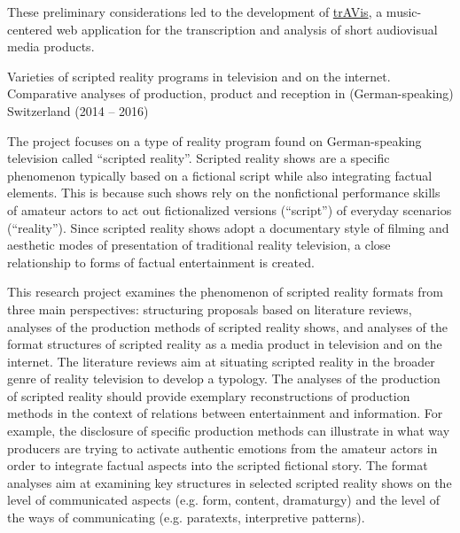 \documentclass[9pt]{article}
\begin{document}
\noindent These preliminary considerations led to the development of \href{http://populaerkultur.unibas.ch/home/av-analyse/travis-en/}{trAVis}, a music-centered web application for the transcription and analysis of short audiovisual media products.

\medskip
{}



\bigskip
{}
\newline\noindent\textsf{\large Varieties of scripted reality programs in television and on the internet. Comparative analyses of production, product and reception in (German-speaking) Switzerland (2014 – 2016)}
\smallskip

\noindent The project focuses on a type of reality program found on German-speaking television called ``scripted reality''. Scripted reality shows are a specific phenomenon typically based on a fictional script while also integrating factual elements. This is because such shows rely on the nonfictional performance skills of amateur actors to act out fictionalized versions (``script'') of everyday scenarios (``reality''). Since scripted reality shows adopt a documentary style of filming and aesthetic modes of presentation of traditional reality television, a close relationship to forms of factual entertainment is created.
\medskip

\noindent This research project examines the phenomenon of scripted reality formats from three main perspectives: structuring proposals based on literature reviews, analyses of the production methods of scripted reality shows, and analyses of the format structures of scripted reality as a media product in television and on the internet. The literature reviews aim at situating scripted reality in the broader genre of reality television to develop a typology. The analyses of the production of scripted reality should provide exemplary reconstructions of production methods in the context of relations between entertainment and information. For example, the disclosure of specific production methods can illustrate in what way producers are trying to activate authentic emotions from the amateur actors in order to integrate factual aspects into the scripted fictional story. The format analyses aim at examining key structures in selected scripted reality shows on the level of communicated aspects (e.g. form, content, dramaturgy) and the level of the ways of communicating (e.g. paratexts, interpretive patterns).
\medskip
\end{document}
